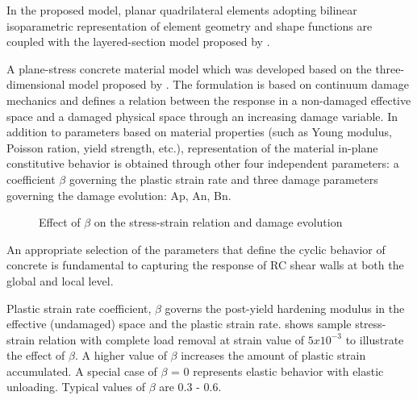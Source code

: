 In the proposed model, planar quadrilateral elements adopting bilinear isoparametric representation of element geometry and shape functions \cite{bathe1976numerical} are coupled with the layered-section model proposed by \cite{lu2015shear}.

A plane-stress concrete material model which was developed based on the three-dimensional model proposed by \cite{faria1998strain}. The formulation is based on continuum damage mechanics and defines a relation between the response in a non-damaged effective space and a damaged physical space through an increasing damage variable. In addition to parameters based on material properties (such as Young modulus, Poisson ration, yield strength, etc.), representation of the material in-plane constitutive behavior is obtained through other four independent parameters: a coefficient $\beta$  governing the plastic strain rate and three damage parameters governing the damage evolution: Ap, An, Bn.



\begin{figure}[!htbp]
  \caption{ Effect of $\beta$ on the stress-strain relation and damage evolution}
  \label{fig:beta}
\end{figure}

An appropriate selection of the parameters that define the cyclic behavior of concrete is fundamental to capturing the response of RC shear walls at both the global and local level.

Plastic strain rate coefficient, $\beta$ governs the post-yield hardening modulus in the effective (undamaged) space and the plastic strain rate. 
 shows sample stress-strain relation with complete load removal at strain value of $5x10^{-3}$ to illustrate the effect of $\beta$. 
A higher value of $\beta$ increases the amount of plastic strain accumulated. 
A special case of $\beta$ = 0 represents elastic behavior with elastic unloading. 
Typical values of $\beta$ are 0.3 - 0.6.


